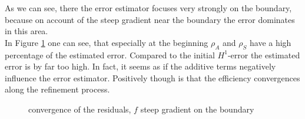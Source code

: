 \documentclass[a4paper, 11pt, twoside]{article}
\begin{document}
As we can see, there the error estimator focuses very strongly on the boundary, 
because on account of the steep gradient near the boundary the error dominates in this area.\\
In Figure \ref{residuals} one can see, that especially at the beginning $\rho_A$ and $\rho_S$ have a high percentage of the estimated error.
Compared to the initial $H^1$-error the estimated error is by far too high.
In fact, it seems as if the additive terms negatively influence the error estimator.
Positively though is that the efficiency convergences along the refinement process.
\begin{figure}[htbp!]
\centering
{}
    \caption{convergence of the residuals, $f$ steep gradient on the boundary}
    \label{residuals}
    \end{figure}
\end{document}
